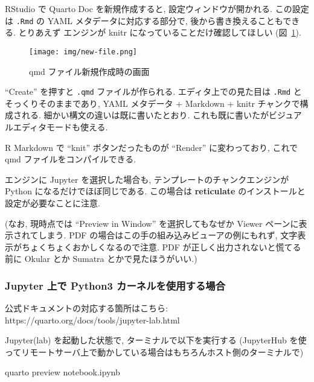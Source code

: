 \documentclass[
  letterpaper,
  DIV=11,
  pandoc,
  ja=standard,
  jafont=noto-otf]{bxjsarticle}
\newenvironment{Shaded}{\begin{snugshade}}{\end{snugshade}}
\newcommand{\ExtensionTok}[1]{\textcolor[rgb]{0.00,0.48,0.65}{#1}}
\newcommand{\NormalTok}[1]{\textcolor[rgb]{0.00,0.48,0.65}{#1}}
\begin{document}
RStudio で Quarto Doc を新規作成すると, 設定ウィンドウが開かれる.
この設定は \texttt{.Rmd} の YAML メタデータに対応する部分で,
後から書き換えることもできる. とりあえず エンジンが knitr
になっていることだけ確認してほしい (図~\ref{fig-new-file}).

\begin{figure}

{\centering 

\texttt{[image: img/new-file.png]}

}

\caption{\label{fig-new-file}qmd ファイル新規作成時の画面}

\end{figure}

``Create'' を押すと \texttt{.qmd} ファイルが作られる.
エディタ上での見た目は \texttt{.Rmd} とそっくりそのままであり, YAML
メタデータ + Markdown + knitr チャンクで構成される.
細かい構文の違いは既に書いたとおり.
これも既に書いたがビジュアルエディタモードも使える.

R Markdown で ``knit'' ボタンだったものが ``Render'' に変わっており,
これで qmd ファイルをコンパイルできる.

エンジンに Jupyter を選択した場合も, テンプレートのチャンクエンジンが
Python になるだけでほぼ同じである. この場合は \textbf{reticulate}
のインストールと設定が必要なことに注意.

(なお, 現時点では ``Preview in Window'' を選択してもなぜか Viewer
ペーンに表示されてしまう. PDF
の場合はこの手の組み込みビューアの例にもれず,
文字表示がちょくちょくおかしくなるので注意. PDF
が正しく出力されないと慌てる前に Okular とか Sumatra
とかで見たほうがいい.)

\hypertarget{jupyter-ux4e0aux3067-python3-ux30abux30fcux30cdux30ebux3092ux4f7fux7528ux3059ux308bux5834ux5408}{%
\subsubsection{Jupyter 上で Python3
カーネルを使用する場合}\label{jupyter-ux4e0aux3067-python3-ux30abux30fcux30cdux30ebux3092ux4f7fux7528ux3059ux308bux5834ux5408}}

公式ドキュメントの対応する箇所はこちら:
https://quarto.org/docs/tools/jupyter-lab.html

Jupyter(lab) を起動した状態で, ターミナルで以下を実行する (JupyterHub
を使ってリモートサーバ上で動かしている場合はもちろんホスト側のターミナルで)

\begin{Shaded}
\begin{Highlighting}[]
\ExtensionTok{quarto}\NormalTok{ preview notebook.ipynb}
\end{Highlighting}
\end{Shaded}
\end{document}
